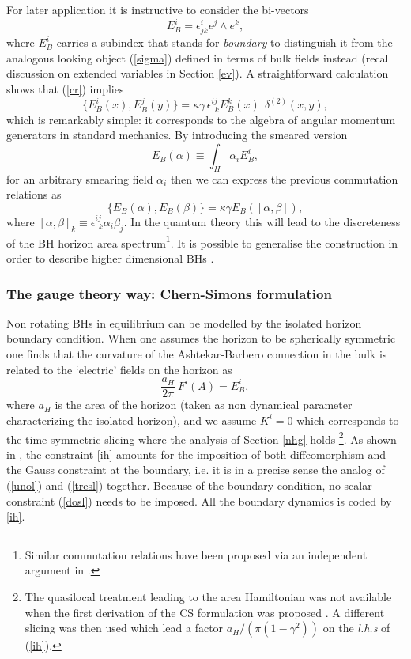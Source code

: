 \documentclass[aps, nofootinbib,superscriptaddress,12pt]{revtex4-2}
\newcommand{\va}{\scriptscriptstyle}
\def\be{\begin{equation}}
\def\ee{\end{equation}}
\begin{document}
For later application it is instructive to consider the bi-vectors 
\be\label{sigmaB} E_{B}^i=\epsilon^{i}_{jk} e^j\wedge e^k, \ee
where $E_{B}^i$ carries a subindex that stands for {\em boundary} to distinguish it from the
analogous looking object (\ref{sigma}) defined in terms of bulk fields instead (recall discussion on extended variables in Section \ref{ev}).  A straightforward calculation shows that (\ref{cr}) implies
\be\label{www}
\{E_{B}^i(x), E^j_{B}(y)\}= { \kappa \gamma}\, \epsilon^{ij}_{\ \ k} E_{B}^k(x) \ \ \delta^{\va (2)}(x,y),
\ee
which is remarkably simple: it corresponds to the algebra of angular momentum generators in standard mechanics.
By introducing the smeared version 
\be\label{fifi}
E_{B}(\alpha)\equiv \int_H\alpha_iE_B^i,
\ee
for an arbitrary smearing field $\alpha_i$ then we can express the previous commutation relations as
\be\label{eee}
\{E_{B}(\alpha),E_{B}(\beta)\}=\kappa \gamma E_{B}([\alpha,\beta]),
\ee
where $[\alpha,\beta]_k\equiv \epsilon^{ij}_{\ \ k} \alpha_i\beta_j$.
In the quantum theory this will lead to the discreteness of the BH horizon area spectrum\footnote{Similar commutation relations have been proposed via an independent argument in \cite{'tHooft:1996tq}.}.  It is possible to generalise the construction in order to describe higher dimensional BHs \cite{Bodendorfer:2013jba}.

\subsubsection{The gauge theory way: Chern-Simons formulation}\label{CSF}

Non rotating BHs in equilibrium can be modelled by the isolated horizon boundary condition. When one assumes the 
horizon to be spherically symmetric one finds that
the curvature of the Ashtekar-Barbero connection in the bulk is related to the `electric' fields on the horizon as
\be\label{ih}
\frac{a_{H}}{2\pi}\  F^i(A)= E_{B}^i,
\ee  
where $a_{H}$ is the area of the horizon (taken as non dynamical parameter characterizing the isolated horizon), and we assume 
$K^i=0$ which corresponds to the time-symmetric slicing where the analysis of Section \ref{nhg} holds \footnote{The quasilocal treatment leading to the area Hamiltonian was not available when the first derivation of the CS formulation was proposed \cite{Engle:2010kt}. A different slicing was then used which lead a factor $a_H/(\pi (1-\gamma^2))$ on the {\em l.h.s} of (\ref{ih}).}. As shown in \cite{Engle:2010kt}, the constraint \eqref{ih} amounts for the imposition of both diffeomorphism and the Gauss constraint at the boundary, i.e. it is in a precise sense the analog of (\ref{unol}) and (\ref{tresl}) together.  Because of the boundary condition, no scalar constraint (\ref{dosl}) needs to be imposed. All the boundary dynamics is coded by \eqref{ih}.  
 
\end{document}
